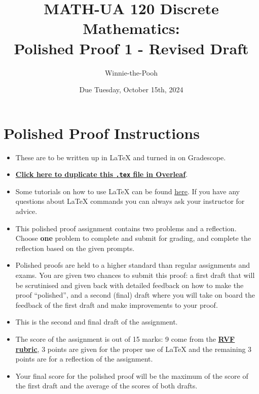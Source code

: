 \documentclass{article}
\title{\textbf{MATH-UA 120 Discrete Mathematics: \\ Polished Proof 1 - Revised Draft}}
\author{%
    Winnie-the-Pooh %
}
\date{Due Tuesday, October 15th, 2024} %
\theoremstyle{definition}
\begin{document}
\maketitle %

\vfill


\section*{Polished Proof Instructions}

\begin{itemize}
    \item These are to be written up in \LaTeX{} and turned in on Gradescope.
    \item \href{https://bit.ly/3TJfkTp}{\textbf{Click here to duplicate this \texttt{.tex} file in Overleaf}}.
    \item Some tutorials on how to use \LaTeX{} can be found \href{https://www.overleaf.com/learn/latex/Tutorials}{\underline{here}}. If you have any questions about \LaTeX{} commands you can always ask your instructor for advice.
    \item This polished proof assignment contains two problems and a reflection. Choose \textbf{one} problem to complete and submit for grading, and complete the reflection based on the given prompts.
    \item Polished proofs are held to a higher standard than regular assignments and exams. You are given two chances to submit this proof: a first draft that will be scrutinised and given back with detailed feedback on how to make the proof ``polished'', and a second (final) draft where you will take on board the feedback of the first draft and make improvements to your proof.
    \item This is the second and final draft of the assignment.
    \item The score of the assignment is out of 15 marks: 9 come from the \href{https://drive.google.com/file/d/1YZhhGv5OyPdx0-VDa6i6cftkzPromMRY/view?usp=drive_link}{\textbf{RVF rubric}}, 3 points are given for the proper use of \LaTeX{} and the remaining 3 points are for a reflection of the assignment.
    \item Your final score for the polished proof will be the maximum of the score of the first draft and the average of the scores of both drafts.
\end{itemize}
\end{document}
